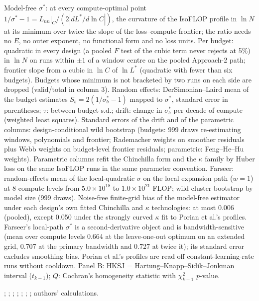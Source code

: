 \begin{table}[tp]
\begin{tablenotes}
Model-free $\sigma^*$: at every compute-optimal point $1/\sigma^*-1=L_{nn}|_C/(2|dL^*/d\ln C|)$, the curvature of the IsoFLOP profile in $\ln N$ at its minimum over twice the slope of the loss--compute frontier; the ratio needs no $E$, no outer exponent, no functional form and no loss units. Per budget: quadratic in every design (a pooled $F$ test of the cubic term never rejects at 5\%) in $\ln N$ on runs within $\pm1$ of a window centre on the pooled Approach-2 path; frontier slope from a cubic in $\ln C$ of $\ln L^*$ (quadratic with fewer than six budgets). Budgets whose minimum is not bracketed by two runs on each side are dropped (valid/total in column 3). Random effects: DerSimonian--Laird mean of the budget estimates $S_b=2(1/\sigma^*_b-1)$ mapped to $\sigma^*$, standard error in parentheses; $\tau$: between-budget s.d.; drift: change in $\sigma^*_b$ per decade of compute (weighted least squares). Standard errors of the drift and of the parametric columns: design-conditional wild bootstrap (budgets: 999 draws re-estimating windows, polynomials and frontier; Rademacher weights on smoother residuals plus Webb weights on budget-level frontier residuals; parametric: Feng--He--Hu weights). Parametric columns refit the Chinchilla form and the $\kappa$ family by Huber loss on the same IsoFLOP runs in the same parameter convention. Farseer: random-effects mean of the local-quadratic $\sigma$ on the local expansion path ($w=1$) at 8 compute levels from $5.0\times10^{18}$ to $1.0\times10^{21}$ FLOP; wild cluster bootstrap by model size (999 draws). Noise-free finite-grid bias of the model-free estimator under each design's own fitted Chinchilla and $\kappa$ technologies: at most 0.006 (pooled), except 0.050 under the strongly curved $\kappa$ fit to Porian et al.'s profiles. Farseer's local-path $\sigma^*$ is a second-derivative object and is bandwidth-sensitive (mean over compute levels 0.664 at the leave-one-out optimum on an extended grid, 0.707 at the primary bandwidth and 0.727 at twice it); its standard error excludes smoothing bias. Porian et al.'s profiles are read off constant-learning-rate runs without cooldown. Panel B: HKSJ = Hartung--Knapp--Sidik--Jonkman interval ($t_{k-1}$); $Q$: Cochran's homogeneity statistic with $\chi^2_{k-1}$ $p$-value.
\end{tablenotes}

\begin{tablenotes}[Source]
\citet{hoffmann2022training}; \citet{besiroglu2024chinchilla}; \citet{grattafiori2024llama}; \citet{czech2026llama3isoflop}; \citet{marin2026ladders}; \citet{porian2024resolving}; \citet{li2025predictableb}; authors' calculations.
\end{tablenotes}
\end{table}
